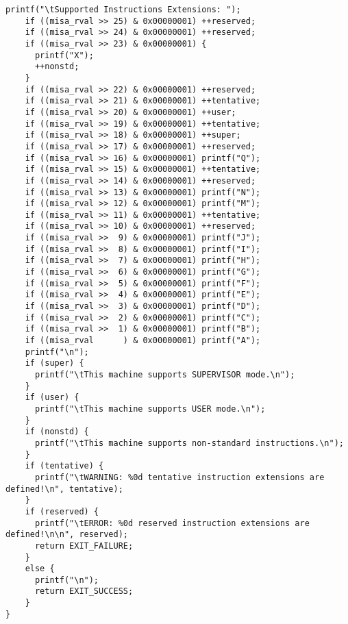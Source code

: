 \begin{lstlisting}[caption={Sanity test for the CV32E40S core.}, label=lst:sample_code]
    printf("\tSupported Instructions Extensions: ");
    if ((misa_rval >> 25) & 0x00000001) ++reserved;
    if ((misa_rval >> 24) & 0x00000001) ++reserved;
    if ((misa_rval >> 23) & 0x00000001) {
      printf("X");
      ++nonstd;
    }
    if ((misa_rval >> 22) & 0x00000001) ++reserved;
    if ((misa_rval >> 21) & 0x00000001) ++tentative;
    if ((misa_rval >> 20) & 0x00000001) ++user;
    if ((misa_rval >> 19) & 0x00000001) ++tentative;
    if ((misa_rval >> 18) & 0x00000001) ++super;
    if ((misa_rval >> 17) & 0x00000001) ++reserved;
    if ((misa_rval >> 16) & 0x00000001) printf("Q");
    if ((misa_rval >> 15) & 0x00000001) ++tentative;
    if ((misa_rval >> 14) & 0x00000001) ++reserved;
    if ((misa_rval >> 13) & 0x00000001) printf("N");
    if ((misa_rval >> 12) & 0x00000001) printf("M");
    if ((misa_rval >> 11) & 0x00000001) ++tentative;
    if ((misa_rval >> 10) & 0x00000001) ++reserved;
    if ((misa_rval >>  9) & 0x00000001) printf("J");
    if ((misa_rval >>  8) & 0x00000001) printf("I");
    if ((misa_rval >>  7) & 0x00000001) printf("H");
    if ((misa_rval >>  6) & 0x00000001) printf("G");
    if ((misa_rval >>  5) & 0x00000001) printf("F");
    if ((misa_rval >>  4) & 0x00000001) printf("E");
    if ((misa_rval >>  3) & 0x00000001) printf("D");
    if ((misa_rval >>  2) & 0x00000001) printf("C");
    if ((misa_rval >>  1) & 0x00000001) printf("B");
    if ((misa_rval      ) & 0x00000001) printf("A");
    printf("\n");
    if (super) {
      printf("\tThis machine supports SUPERVISOR mode.\n");
    }
    if (user) {
      printf("\tThis machine supports USER mode.\n");
    }
    if (nonstd) {
      printf("\tThis machine supports non-standard instructions.\n");
    }
    if (tentative) {
      printf("\tWARNING: %0d tentative instruction extensions are defined!\n", tentative);
    }
    if (reserved) {
      printf("\tERROR: %0d reserved instruction extensions are defined!\n\n", reserved);
      return EXIT_FAILURE;
    }
    else {
      printf("\n");
      return EXIT_SUCCESS;
    }
}

\end{lstlisting}



